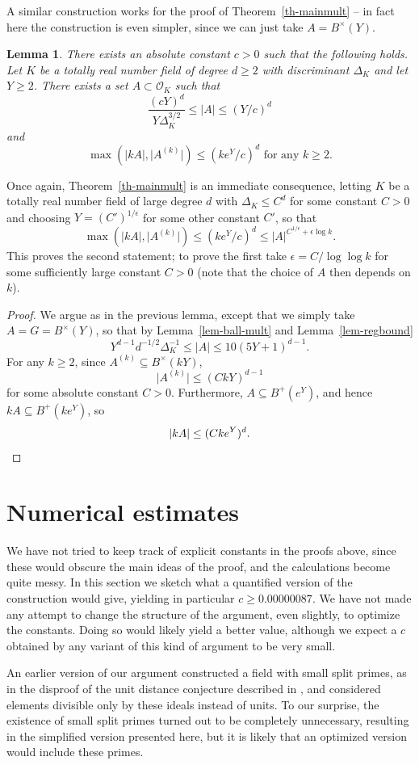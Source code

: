 \documentclass{amsart}
\numberwithin{equation}{section}
\newcommand{\abs}[1]{\mathopen{}\left| #1\mathclose{}\right|}
\newcommand{\Abs}[1]{\lvert #1\rvert}
\newtheorem{lemma}[theorem]{Lemma}
\begin{document}
A similar construction works for the proof of Theorem~\ref{th-mainmult} -- in fact here the construction is even simpler, since we can just take $A=B^\times(Y)$. 
\begin{lemma}\label{lem-mainmult}
There exists an absolute constant $c>0$ such that the following holds. Let $K$ be a totally real number field of degree $d\geq 2$ with discriminant $\Delta_K$ and let $Y\geq 2$. There exists a set $A\subset \mathcal{O}_K$ such that
\[\frac{(cY)^d}{Y\Delta_K^{3/2}}\leq \abs{A}\leq (Y/c)^d\]
and
\[\max(\abs{kA},\Abs{A^{(k)}})\leq (ke^Y/c)^d\textrm{ for any }k\geq 2.\]
\end{lemma}
Once again, Theorem~\ref{th-mainmult} is an immediate consequence, letting $K$ be a totally real number field of large degree $d$ with $\Delta_K\leq C^d$ for some constant $C>0$ and choosing $Y=(C')^{1/\epsilon}$ for some other constant $C'$, so that
\[\max(\abs{kA},\Abs{A^{(k)}})\leq (ke^Y/c)^d\leq \abs{A}^{C^{1/\epsilon}+\epsilon \log k}.\]
This proves the second statement; to prove the first take $\epsilon=C/\log\log k$ for some sufficiently large constant $C>0$ (note that the choice of $A$ then depends on $k$).
\begin{proof}
We argue as in the previous lemma, except that we simply take $A=G=B^\times(Y)$, so that by Lemma~\ref{lem-ball-mult} and Lemma~\ref{lem-regbound}
\[Y^{d-1}d^{-1/2}\Delta_K^{-1}\leq \abs{A}\leq 10(5Y+1)^{d-1}.\]
For any $k\geq 2$, since $A^{(k)}\subseteq B^\times(kY)$,
\[\Abs{A^{(k)}}\leq (CkY)^{d-1}\]
for some absolute constant $C>0$. Furthermore, $A\subseteq B^+(e^Y)$, and hence $kA\subseteq B^+(ke^Y)$, so
\[\abs{kA}\leq (Cke^Y)^d.\qedhere\]
\end{proof}


\section{Numerical estimates}\label{sec-numerical}
We have not tried to keep track of explicit constants in the proofs above, since these would obscure the main ideas of the proof, and the calculations become quite messy. In this section we sketch what a quantified version of the construction would give, yielding in particular $c\geq 0.00000087$. We have not made any attempt to change the structure of the argument, even slightly, to optimize the constants. Doing so would likely yield a better value, although we expect a $c$ obtained by any variant of this kind of argument to be very small.

An earlier version of our argument constructed a field with small split primes, as in the disproof of the unit distance conjecture described in \cite{ABGLSSTWW2026UnitDistance}, and considered elements divisible only by these ideals instead of units. To our surprise, the existence of small split primes turned out to be completely unnecessary, resulting in the simplified version presented here, but it is likely that an optimized version would include these primes. 
\end{document}

